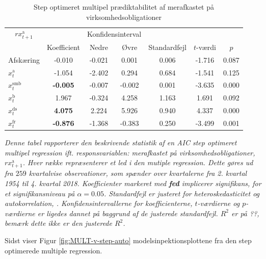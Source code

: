 \documentclass[
  a4paper,
  oneside]{memoir}
\begin{document}
\begin{table}[H]

\caption{\label{tab:MULT-step-v}Step optimeret multipel prædiktabilitet af merafkastet på virksomhedsobligationer}
\centering
\begin{threeparttable}
\begin{tabular}[t]{lcccccc}
\toprule
\multicolumn{1}{c}{$rx_{t+1}^{\text{a}}$} & \multicolumn{1}{c}{ } & \multicolumn{2}{c}{Konfidensinterval} & \multicolumn{3}{c}{ } \\
\cmidrule(l{3pt}r{3pt}){1-1} \cmidrule(l{3pt}r{3pt}){3-4}
  & Koefficient & Nedre & Øvre & Standardfejl & $t$-værdi & $p$\\
\midrule
\rowcolor{gray!6}  Afskæring & -0.010 & -0.021 & 0.001 & 0.006 & -1.716 & 0.087\\
$x_t^{\text{a}}$ & -1.054 & -2.402 & 0.294 & 0.684 & -1.541 & 0.125\\
\rowcolor{gray!6}  $x_t^{\text{smb}}$ & \textbf{-0.005} & -0.007 & -0.002 & 0.001 & -3.635 & 0.000\\
$x_t^{\text{b}}$ & 1.967 & -0.324 & 4.258 & 1.163 & 1.691 & 0.092\\
\rowcolor{gray!6}  $x_t^{\text{ds}}$ & \textbf{ 4.075} & 2.224 & 5.926 & 0.940 & 4.337 & 0.000\\
$x_t^{\text{fr}}$ & \textbf{-0.876} & -1.368 & -0.383 & 0.250 & -3.499 & 0.001\\
\bottomrule
\end{tabular}
\begin{tablenotes}
\item \textit{Denne tabel rapporterer den beskrivende statistik af en AIC step optimeret multipel regression ift. responsvariablen: merafkastet på virksomhedsobligationer, $rx_{t+1}^{\text{a}}$. Hver række repræsenterer et led i den mutiple regression. Dette gøres ud fra $259$ kvartalvise observationer, som spænder over kvartalerne fra 2. kvartal 1954 til 4. kvartal 2018. Koefficienter markeret med \textbf{fed} implicerer signifikans, for et signifikansniveau på $\alpha=0.05$. Standardfejl er justeret for heteroskedasticitet og autokorrelation, \citep{Newey1987}. Konfidensintervallerne for koefficienterne, $t$-værdierne og $p$-værdierne er ligedes dannet på baggrund af de justerede standardfejl. $R^2$ er på ??, bemærk dette ikke er den justerede $R^2$.}
\end{tablenotes}
\end{threeparttable}
\end{table}

Sidst viser Figur \ref{fig:MULT-v-step-auto} modelsinpektionsplottene fra den step optimerede multiple regression.
\end{document}
